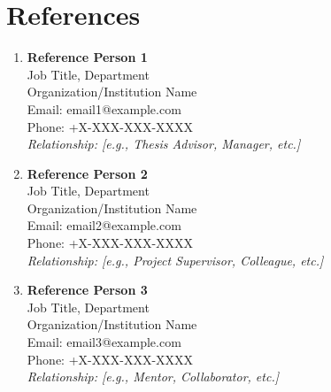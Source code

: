 \documentclass[a4paper,11pt]{article}
\begin{document}
\section{\textbf{References}}
\vspace{-0.2mm}
\small{
\begin{enumerate}[leftmargin=*,labelsep=2mm]
\item \textbf{Reference Person 1}\\
   Job Title, Department\\
   Organization/Institution Name\\
   Email: email1@example.com\\
   Phone: +X-XXX-XXX-XXXX\\
   \textit{Relationship: [e.g., Thesis Advisor, Manager, etc.]}

\item \textbf{Reference Person 2}\\
   Job Title, Department\\
   Organization/Institution Name\\
   Email: email2@example.com\\
   Phone: +X-XXX-XXX-XXXX\\
   \textit{Relationship: [e.g., Project Supervisor, Colleague, etc.]}

\item \textbf{Reference Person 3}\\
   Job Title, Department\\
   Organization/Institution Name\\
   Email: email3@example.com\\
   Phone: +X-XXX-XXX-XXXX\\
   \textit{Relationship: [e.g., Mentor, Collaborator, etc.]}
\end{enumerate}
}
\end{document}
